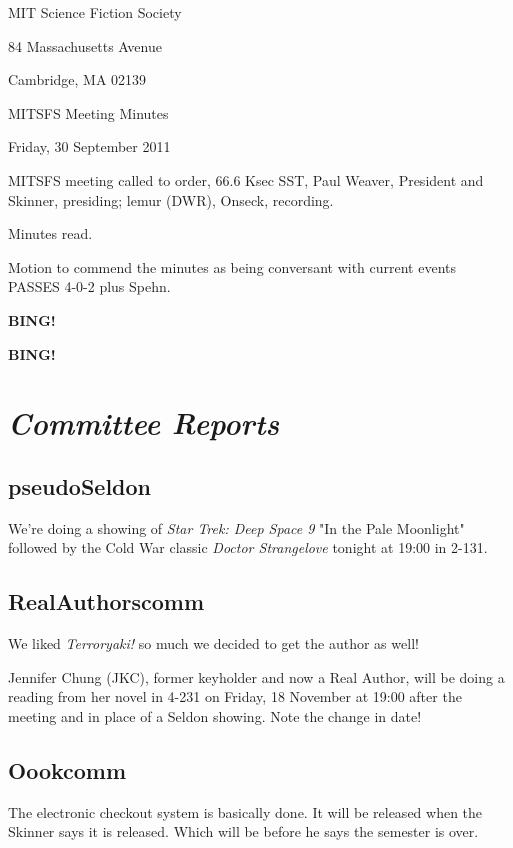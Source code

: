 \documentclass[10pt]{article}
\newcommand{\bing}{{\bf BING!} }
\newcommand{\goto}[1]{\bing \vskip 12pt \section*{{\em{#1}}}}
\newcommand{\ps}{ plus Spehn\xspace}
\newcommand{\skinner}{Paul Weaver, President and Skinner}
\newcommand{\onseck}{lemur (DWR), Onseck}
\newcommand{\meetingdate}{Friday, 30 September 2011}
\begin{document}
\begin{center}

MIT Science Fiction Society

84 Massachusetts Avenue

Cambridge, MA 02139

\vspace{12pt}

MITSFS Meeting Minutes

\meetingdate

\end{center}

\vspace{18pt}

\setlength{\parskip}{6pt}

\noindent
MITSFS meeting called to order, 66.6 Ksec SST,
\skinner, presiding; \onseck, recording.

Minutes read.

Motion to commend the minutes as being conversant with current events
PASSES 4-0-2\ps.

\bing

\goto{Committee Reports}

\subsection*{pseudoSeldon}

We're doing a showing of \emph{Star Trek: Deep Space 9} "In the Pale Moonlight"
followed by the Cold War classic \emph{Doctor Strangelove} tonight at 19:00
in 2-131.


\subsection*{RealAuthorscomm}

We liked \emph{Terroryaki!} so much we decided to get the author as well!

Jennifer Chung (JKC), former keyholder and now a Real Author, will be doing
a reading from her novel in 4-231 on Friday, 18 November at 19:00 after the 
meeting and in place of a Seldon showing.  Note the change in date!


\subsection*{Oookcomm}

The electronic checkout system is basically done.  It will be released
when the Skinner says it is released.  Which will be before he says the
semester is over.
\end{document}
